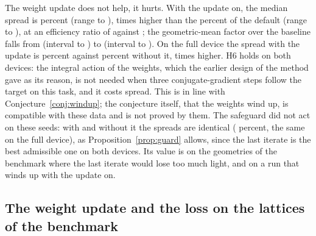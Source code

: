 The weight update does not help, it hurts. With the update on, the median spread is \ablBWeightsSig{} percent (range \ablBWeightsSigMin{} to \ablBWeightsSigMax{}), \ablBWeightsRatio{} times higher than the \ablBFullSig{} percent of the default (range \ablBFullSigMin{} to \ablBFullSigMax{}), at an efficiency ratio of \ablBWeightsEff{} against \ablBFullEff{}; the geometric-mean factor over the baseline falls from \ablBFullFac{} (interval \ablBFullFacLo{} to \ablBFullFacHi{}) to \ablBWeightsFac{} (interval \ablBWeightsFacLo{} to \ablBWeightsFacHi{}). On the full device the
spread with the update is \ablBFWeightsSig{} percent against \ablBFFullSig{} percent without it, \ablBFWeightsRatio{} times higher. H6 holds on both devices: the integral action of the weights, which the earlier design of the method gave as its reason, is not needed when three conjugate-gradient steps follow the target on this task, and it costs spread. This is in line with Conjecture~\ref{conj:windup}; the conjecture itself, that the weights wind up, is compatible with these data and is not proved by them. The safeguard did not act on these seeds: with and without it the spreads are identical (\ablBNoGuardSig{} percent, the same on the full device), as Proposition~\ref{prop:guard} allows, since the last iterate is the best admissible one on both devices. Its value is on the geometries of the benchmark where the last iterate would lose too much light, and on a run that winds up with the update on.

\subsection{The weight update and the loss on the lattices of the benchmark}


